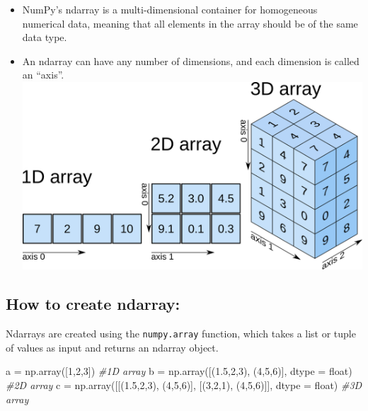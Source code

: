 \documentclass[11pt]{article}
\providecommand{\tightlist}{%
      \setlength{\itemsep}{0pt}\setlength{\parskip}{0pt}}
\newenvironment{Shaded}{}{}
\newcommand{\DecValTok}[1]{\textcolor[rgb]{0.25,0.63,0.44}{{#1}}}
\newcommand{\FloatTok}[1]{\textcolor[rgb]{0.25,0.63,0.44}{{#1}}}
\newcommand{\CommentTok}[1]{\textcolor[rgb]{0.38,0.63,0.69}{\textit{{#1}}}}
\newcommand{\NormalTok}[1]{{#1}}
\newcommand{\OperatorTok}[1]{\textcolor[rgb]{0.40,0.40,0.40}{{#1}}}
\newcommand{\BuiltInTok}[1]{{#1}}
\begin{document}
\begin{itemize}
\tightlist
\item
  NumPy's ndarray is a multi-dimensional container for homogeneous
  numerical data, meaning that all elements in the array should be of
  the same data type.
\item
  An ndarray can have any number of dimensions, and each dimension is
  called an ``axis''. \includegraphics{nda.png}
\end{itemize}

\hypertarget{how-to-create-ndarray}{%
\subsection{How to create ndarray:}\label{how-to-create-ndarray}}

Ndarrays are created using the \texttt{numpy.array} function, which
takes a list or tuple of values as input and returns an ndarray object.

\begin{Shaded}
\begin{Highlighting}[]
\NormalTok{a }\OperatorTok{=}\NormalTok{ np.array([}\DecValTok{1}\NormalTok{,}\DecValTok{2}\NormalTok{,}\DecValTok{3}\NormalTok{]) }\CommentTok{\#1D array}
\NormalTok{b }\OperatorTok{=}\NormalTok{ np.array([(}\FloatTok{1.5}\NormalTok{,}\DecValTok{2}\NormalTok{,}\DecValTok{3}\NormalTok{), (}\DecValTok{4}\NormalTok{,}\DecValTok{5}\NormalTok{,}\DecValTok{6}\NormalTok{)], dtype }\OperatorTok{=} \BuiltInTok{float}\NormalTok{) }\CommentTok{\#2D array}
\NormalTok{c }\OperatorTok{=}\NormalTok{ np.array([[(}\FloatTok{1.5}\NormalTok{,}\DecValTok{2}\NormalTok{,}\DecValTok{3}\NormalTok{), (}\DecValTok{4}\NormalTok{,}\DecValTok{5}\NormalTok{,}\DecValTok{6}\NormalTok{)], [(}\DecValTok{3}\NormalTok{,}\DecValTok{2}\NormalTok{,}\DecValTok{1}\NormalTok{), (}\DecValTok{4}\NormalTok{,}\DecValTok{5}\NormalTok{,}\DecValTok{6}\NormalTok{)]], dtype }\OperatorTok{=} \BuiltInTok{float}\NormalTok{) }\CommentTok{\#3D array}
\end{Highlighting}
\end{Shaded}
\end{document}
